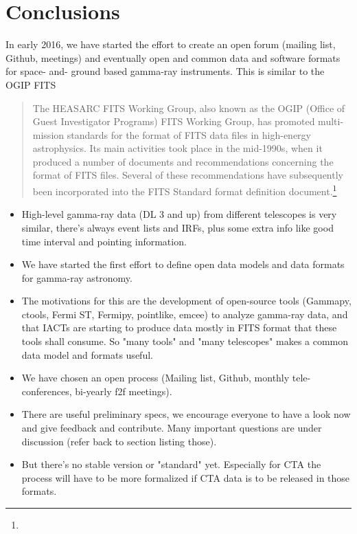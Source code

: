 \section{Conclusions}

In early 2016, we have started the \gadf effort to create an open forum (mailing list, Github, meetings) and eventually open and common data and software formats for space- and- ground based gamma-ray instruments. This is similar to the OGIP FITS


\begin{quotation}
The HEASARC FITS Working Group, also known as the OGIP (Office of Guest Investigator Programs) FITS Working Group, has promoted multi-mission standards for the format of FITS data files in high-energy astrophysics. Its main activities took place in the mid-1990s, when it produced a number of documents and recommendations concerning the format of FITS files. Several of these recommendations have subsequently been incorporated into the FITS Standard format definition document.\footnote{\ogip}
\end{quotation}


\begin{itemize}
\item High-level gamma-ray data (DL 3 and up) from different telescopes is very similar, there's always event lists and IRFs, plus some extra info like good time interval and pointing information.
\item We have started the first effort to define open data models and data formats for gamma-ray astronomy.
\item The motivations for this are the development of open-source tools
(Gammapy, ctools, Fermi ST, Fermipy, pointlike, emcee) to analyze gamma-ray data, and that IACTs are starting to produce data mostly in FITS format that these tools shall consume. So "many tools" and "many telescopes" makes a common data model and formats useful.
\item We have chosen an open process (Mailing list, Github, monthly tele-conferences, bi-yearly f2f meetings).
\item There are useful preliminary specs, we encourage everyone to have a look now and give feedback and contribute. Many important questions are under discussion (refer back to section listing those).
\item But there's no stable version or "standard" yet. Especially for CTA the process will have to be more formalized if CTA data is to be released in those formats.
\end{itemize}
